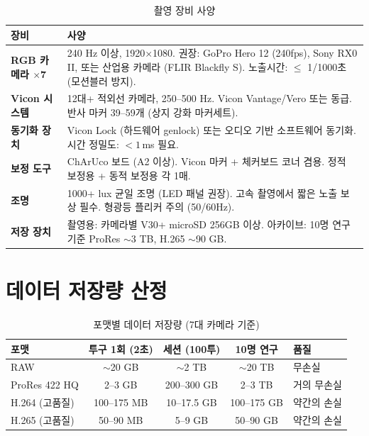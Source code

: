 \documentclass[11pt, a4paper]{report}
\begin{document}
\begin{table}[H]
\centering
\caption{촬영 장비 사양}
\label{tab:capture_hw}
\renewcommand{\arraystretch}{1.3}
\begin{tabularx}{\textwidth}{lX}
\toprule
\textbf{장비} & \textbf{사양} \\
\midrule
\textbf{RGB 카메라 $\times$7} &
  240 Hz 이상, 1920$\times$1080.
  권장: GoPro Hero 12 (240fps), Sony RX0 II, 또는 산업용 카메라 (FLIR Blackfly S).
  노출시간: $\leq$ 1/1000초 (모션블러 방지). \\
\addlinespace
\textbf{Vicon 시스템} &
  12대+ 적외선 카메라, 250--500 Hz.
  Vicon Vantage/Vero 또는 동급.
  반사 마커 39--59개 (상지 강화 마커세트). \\
\addlinespace
\textbf{동기화 장치} &
  Vicon Lock (하드웨어 genlock) 또는 오디오 기반 소프트웨어 동기화.
  시간 정밀도: $< 1$\,ms 필요. \\
\addlinespace
\textbf{보정 도구} &
  ChArUco 보드 (A2 이상). Vicon 마커 + 체커보드 코너 겸용.
  정적 보정용 + 동적 보정용 각 1매. \\
\addlinespace
\textbf{조명} &
  1000+ lux 균일 조명 (LED 패널 권장).
  고속 촬영에서 짧은 노출 보상 필수. 형광등 플리커 주의 (50/60Hz). \\
\addlinespace
\textbf{저장 장치} &
  촬영용: 카메라별 V30+ microSD 256GB 이상.
  아카이브: 10명 연구 기준 ProRes $\sim$3 TB, H.265 $\sim$90 GB. \\
\bottomrule
\end{tabularx}
\end{table}

\section{데이터 저장량 산정}

\begin{table}[H]
\centering
\caption{포맷별 데이터 저장량 (7대 카메라 기준)}
\label{tab:storage}
\renewcommand{\arraystretch}{1.3}
\begin{tabular}{lcccl}
\toprule
\textbf{포맷} & \textbf{투구 1회 (2초)} & \textbf{세션 (100투)} & \textbf{10명 연구} & \textbf{품질} \\
\midrule
RAW & $\sim$20 GB & $\sim$2 TB & $\sim$20 TB & 무손실 \\
ProRes 422 HQ & 2--3 GB & 200--300 GB & 2--3 TB & 거의 무손실 \\
H.264 (고품질) & 100--175 MB & 10--17.5 GB & 100--175 GB & 약간의 손실 \\
H.265 (고품질) & 50--90 MB & 5--9 GB & 50--90 GB & 약간의 손실 \\
\bottomrule
\end{tabular}
\end{table}
\end{document}
